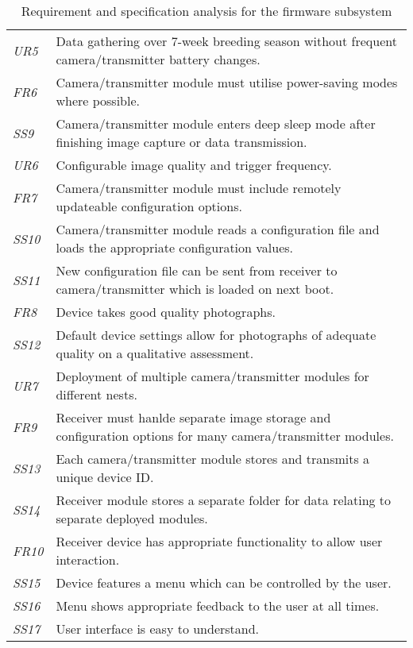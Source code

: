 \documentclass[class=report,11pt,crop=false]{standalone}
\begin{document}
\begin{table}[ht]
\begin{scriptsize}
\begin{tabularx}{\textwidth}{|p{} X|}
        \textit{UR5} & Data gathering over 7-week breeding season without frequent camera/transmitter battery changes.\\
        \textit{FR6} & Camera/transmitter module must utilise power-saving modes where possible.\\
        \textit{SS9} & Camera/transmitter module enters deep sleep mode after finishing image capture or data transmission. \\ \hline

        \textit{UR6} & Configurable image quality and trigger frequency.\\
        \textit{FR7} & Camera/transmitter module must include remotely updateable configuration options.\\
        \textit{SS10} & Camera/transmitter module reads a configuration file and loads the appropriate configuration values. \\
        \textit{SS11} & New configuration file can be sent from receiver to camera/transmitter which is loaded on next boot. \\ \hline
        
        \textit{FR8} & Device takes good quality photographs. \\
        \textit{SS12} & Default device settings allow for photographs of adequate quality on a qualitative assessment. \\ \hline

        \textit{UR7} & Deployment of multiple camera/transmitter modules for different nests.\\
        \textit{FR9} & Receiver must hanlde separate image storage and configuration options for many camera/transmitter modules.\\
        \textit{SS13} & Each camera/transmitter module stores and transmits a unique device ID.\\
        \textit{SS14} & Receiver module stores a separate folder for data relating to separate deployed modules.\\ \hline

        \textit{FR10} & Receiver device has appropriate functionality to allow user interaction.\\
        \textit{SS15} & Device features a menu which can be controlled by the user.\\
        \textit{SS16} & Menu shows appropriate feedback to the user at all times.\\
        \textit{SS17} & User interface is easy to understand.\\ \hline
        


    \end{tabularx}
    \end{scriptsize}
    \caption{Requirement and specification analysis for the firmware subsystem}
    \label{tab:firmware-requirements}
\end{table}
\end{document}

